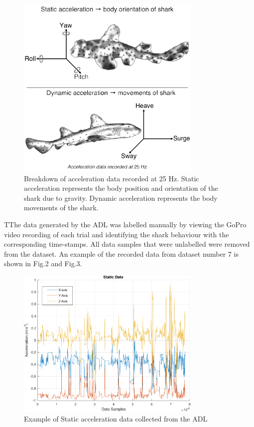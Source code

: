 \documentclass[conference]{IEEEtran}
\begin{document}
\begin{figure}[h]
	\centering
	\includegraphics[width=3.49in]{accel.pdf}
	\caption{Breakdown of acceleration data recorded at 25 Hz. Static acceleration represents the body position and orientation of the shark due to gravity. Dynamic acceleration represents the body movements of the shark.}
	\label{accel}
\end{figure}

TThe data generated by the ADL was labelled manually by viewing the GoPro video recording of each trial and identifying the shark behaviour with the corresponding time-stamps. All data samples that were unlabelled were removed from the dataset. An example of the recorded data from dataset number 7 is shown in Fig.2 and Fig.3.



\begin{figure}[h]
	\centering
	\includegraphics[width=3.49in]{1_static.pdf}
	\caption{Example of Static acceleration data collected from the ADL}
	\label{static}
\end{figure}
\end{document}
